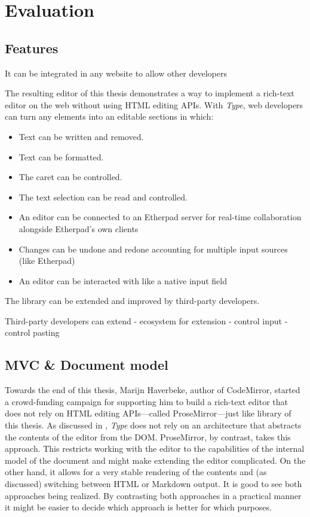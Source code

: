 
\chapter{Evaluation}
\label{ch:evaluation}


\section{Features}

It can be integrated in any website to allow other developers

The resulting editor of this thesis demonstrates a way to implement a rich-text editor on the web without using HTML editing APIs. With \textit{Type}, web developers can turn any elements into an editable sections in which:


\begin{itemize}
\item Text can be written and removed.
\item Text can be formatted.
\item The caret can be controlled.
\item The text selection can be read and controlled.
\item An editor can be connected to an Etherpad server for real-time collaboration alongside Etherpad's own clients
\item Changes can be undone and redone accounting for multiple input sources (like Etherpad)
\item An editor can be interacted with like a native input field
\end{itemize}


 
The library can be extended and improved by third-party developers.
 
Third-party developers can extend
 - ecosystem for extension
 - control input
 - control pasting
 
\section{MVC \& Document model}

Towards the end of this thesis, Marijn Haverbeke, author of CodeMirror, started a crowd-funding campaign for supporting him to build a rich-text editor that does not rely on HTML editing APIs---called ProseMirror---just like library of this thesis. As discussed in , \textit{Type} does not rely on an architecture that abstracts the contents of the editor from the DOM. ProseMirror, by contrast, takes this approach. This restricts working with the editor to the capabilities of the internal model of the document and might make extending the editor complicated. On the other hand, it allows for a very stable rendering of the contents and (as discussed) switching between HTML or Markdown output. It is good to see both approaches being realized. By contrasting both approaches in a practical manner it might be easier to decide which approach is better for which purposes.

